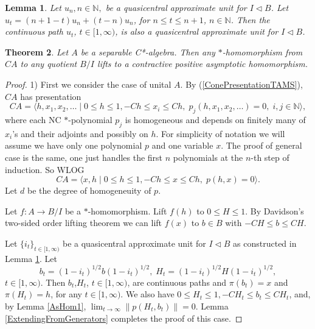 \documentclass{article}%
\newtheorem{theorem}{Theorem}
\newtheorem{lemma}[theorem]{Lemma}
\begin{document}
\begin{lemma}\label{continuousqau} Let $u_n, n\in \mathbb N,$ be a quasicentral approximate unit for $I\triangleleft B$. Let $u_t = (n+1-t)u_n + (t-n)u_n$, for $n\le t\le n+1$, $n\in \mathbb N$. Then the continuous path $u_t$, $t\in [1, \infty)$, is also a quasicentral approximate unit for $I\triangleleft B$.
\end{lemma}


\begin{theorem}\label{cones} Let $A$ be a  separable C*-algebra. Then any $\ast$-homomorphism from $CA$ to any quotient $B/I$ lifts to a contractive positive asymptotic homomorphism.
\end{theorem}
\begin{proof}  1) First we consider the case of unital $A$. By (\ref{ConePresentationTAMS}), $CA$ has presentation
$$CA = \langle h,  x_1, x_2, \ldots \;|\;  0\le h\le 1, -Ch \le x_i\le Ch, \; p_j (h, x_1, x_2, \ldots) = 0, \; i, j\in \mathbb N\rangle,$$ where each NC $\ast$-polynomial $p_j$ is homogeneous and depends on finitely many of $x_i$'s and their adjoints and possibly on $h$. For simplicity of notation we will assume we have only one polynomial $p$ and one variable $x$. The proof of general case is the same, one just handles the first $n$ polynomials at the $n$-th step of induction.  So WLOG
$$CA = \langle x, h \;|\; 0\le h\le 1, -Ch \le x \le Ch, \; p(h, x) = 0\rangle.$$ Let $d$ be the degree of homogeneuity of $p$.


Let $f: A \to B/I$ be a $\ast$-homomorphism.
Lift $f(h)$ to $0\le H\le 1$. By Davidson's  two-sided order lifting theorem \cite[Lemma 2.1]{DavidsonLiftingPositive} we can lift $f(x)$ to $b\in B$ with  $-CH \le b\le CH$.

Let $\{i_{t}\}_{t\in [1, \infty)}$ be a quasicentral approximate unit for $I\triangleleft B$ as constructed in Lemma \ref{continuousqau}.
Let $$b_t= (1-i_t)^{1/2} b (1-i_t)^{1/2}, \; H_t =(1-i_t)^{1/2}H(1-i_t)^{1/2},$$
$t\in [1, \infty)$. Then $b_t$,$H_t$,  $t\in [1, \infty)$, are continuous paths and  $\pi(b_t)= x$ and $\pi(H_t)=h$, for any $t\in [1, \infty)$.
We also have $0\le H_t\le 1, -CH_t \le b_t\le CH_t$, and, by  Lemma \ref{AsHom1},  $ \lim_{t\to \infty}  \|p(H_t, b_t)\| = 0.$
Lemma \ref{ExtendingFromGenerators}  completes the proof of this case.



\end{proof}
\end{document}
